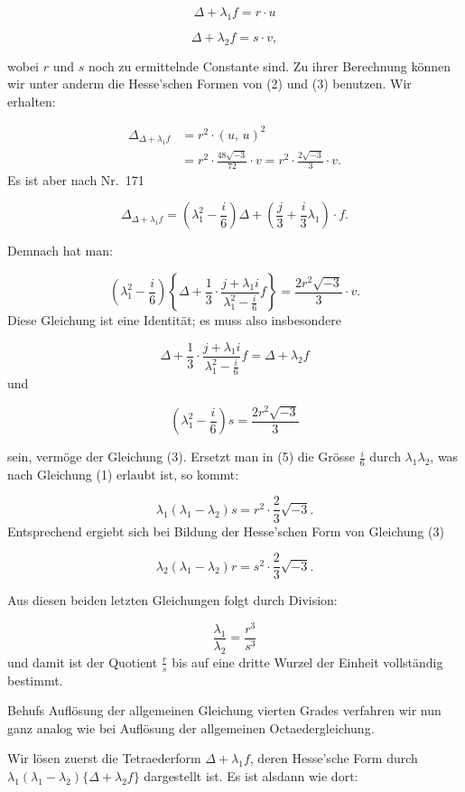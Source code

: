 \documentclass[11pt]{article}
\providecommand{\weberpage}[1]{}
\providecommand{\weq}[2]{\begin{equation}\tag{#1}#2\end{equation}}
\let\Delta\varDelta
\begin{document}
\weq{2}{\Delta+\lambda_1 f = r\cdot u}

\weq{3}{\Delta+\lambda_2 f = s\cdot v,}

wobei $r$ und $s$ noch zu ermittelnde Constante sind. Zu ihrer Berechnung können wir unter anderm die Hesse'schen Formen von (2) und (3) benutzen. Wir erhalten:

\[
\begin{aligned}
\Delta_{\Delta+\lambda_1 f} &= r^2\cdot(u,\,u)^2\\
&= r^2\cdot\frac{48\sqrt{-3}}{72}\cdot v = r^2\cdot\frac{2\sqrt{-3}}{3}\cdot v.
\end{aligned}
\]
Es ist aber nach Nr.\ 171

\weq{4}{\Delta_{\Delta+\lambda_1 f} = \left(\lambda_1^2-\frac{i}{6}\right)\Delta+\left(\frac{j}{3}+\frac{i}{3}\lambda_1\right)\cdot f.}

Demnach hat man:

\[
\left(\lambda_1^2-\frac{i}{6}\right)\left\{\Delta+\frac{1}{3}\cdot\frac{j+\lambda_1 i}{\lambda_1^2-\frac{i}{6}}f\right\} = \frac{2r^2\sqrt{-3}}{3}\cdot v.
\]
Diese Gleichung ist eine Identität; es muss also insbesondere

\[
\Delta+\frac{1}{3}\cdot\frac{j+\lambda_1 i}{\lambda_1^2-\frac{i}{6}}f = \Delta+\lambda_2 f
\]
und

\weq{5}{\left(\lambda_1^2-\frac{i}{6}\right)s = \frac{2r^2\sqrt{-3}}{3}}

sein, vermöge der Gleichung (3). Ersetzt man in (5) die Grösse $\frac{i}{6}$ durch $\lambda_1\lambda_2$, was nach Gleichung (1) erlaubt ist, so kommt:

\[
\lambda_1(\lambda_1-\lambda_2)s = r^2\cdot\frac{2}{3}\sqrt{-3}.
\]
Entsprechend ergiebt sich bei Bildung der Hesse'schen Form von Gleichung (3)

\weq{6}{\lambda_2(\lambda_1-\lambda_2)r = s^2\cdot\frac{2}{3}\sqrt{-3}.}


\weberpage{219}

Aus diesen beiden letzten Gleichungen folgt durch Division:

\[
\frac{\lambda_1}{\lambda_2} = \frac{r^3}{s^3}
\]
und damit ist der Quotient $\frac{r}{s}$ bis auf eine dritte Wurzel der Einheit vollständig bestimmt.

Behufs Auflösung der allgemeinen Gleichung vierten Grades verfahren wir nun ganz analog wie bei Auflösung der allgemeinen Octaedergleichung.

Wir lösen zuerst die Tetraederform $\Delta+\lambda_1 f$, deren Hesse'sche Form durch $\lambda_1(\lambda_1-\lambda_2)\{\Delta+\lambda_2 f\}$ dargestellt ist. Es ist alsdann wie dort:
\end{document}
